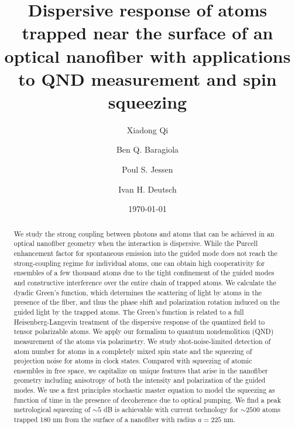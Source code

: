 \documentclass[preprint, aps,pra,onecolumn]{revtex4-1} %
\begin{document}
\title{Dispersive response of atoms trapped near the surface of an optical nanofiber with applications to QND measurement and spin squeezing}
\author{Xiadong Qi}
\author{Ben Q. Baragiola}
\author{Poul S. Jessen}
\author{Ivan H. Deutsch}
\date{\today}

\begin{abstract}
We study the strong coupling between photons and atoms that can be achieved in an optical nanofiber geometry when the interaction is dispersive.  While the Purcell enhancement factor for spontaneous emission into the guided mode does not reach the strong-coupling regime for individual atoms, one can obtain high cooperativity for ensembles of a few thousand atoms due to the tight confinement of the guided modes and constructive interference over the entire chain of trapped atoms. We calculate the dyadic Green's function, which determines the scattering of light by atoms in the presence of the fiber, and thus the phase shift and polarization rotation induced on the guided light by the trapped atoms.  The Green's function is related to a full Heisenberg-Langevin treatment of the dispersive response of the quantized field to tensor polarizable atoms.  We apply our formalism to quantum nondemolition (QND) measurement of the atoms via polarimetry.  We study shot-noise-limited detection of atom number for atoms in a completely mixed spin state and the squeezing of projection noise for atoms in clock states.  Compared with squeezing of atomic ensembles in free space, we capitalize on unique features that arise in the nanofiber geometry including anisotropy of both the intensity and polarization of the guided modes.  We use a first principles stochastic master equation to model the squeezing as function of time in the presence of decoherence due to optical pumping.  We find a peak metrological squeezing of $\sim 5$ dB is achievable with current technology for $\sim 2500$ atoms trapped 180 nm from the surface of a nanofiber with radius $a=225$ nm.  
\end{abstract}
\end{document}

